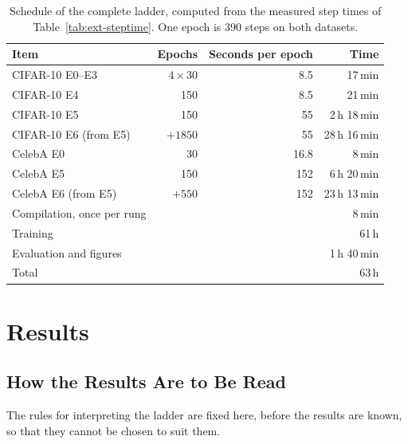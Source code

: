 \begin{table}[htbp]
    \centering
    \caption{Schedule of the complete ladder, computed from the measured step times of
    Table~\ref{tab:ext-steptime}. One epoch is 390 steps on both datasets.}
    \label{tab:ext-schedule}
    \begin{tabular}{lrrr}
        \toprule
        Item & Epochs & Seconds per epoch & Time \\
        \midrule
        CIFAR-10 E0--E3              & $4 \times 30$ & 8.5  & 17\,min \\
        CIFAR-10 E4                  & 150           & 8.5  & 21\,min \\
        CIFAR-10 E5                  & 150           & 55   & 2\,h 18\,min \\
        CIFAR-10 E6 (from E5)        & $+1850$       & 55   & 28\,h 16\,min \\
        CelebA E0                    & 30            & 16.8 & 8\,min \\
        CelebA E5                    & 150           & 152  & 6\,h 20\,min \\
        CelebA E6 (from E5)          & $+550$        & 152  & 23\,h 13\,min \\
        Compilation, once per rung   &               &      & 8\,min \\
        \midrule
        Training                     &               &      & 61\,h \\
        Evaluation and figures       &               &      & 1\,h 40\,min \\
        \midrule
        Total                        &               &      & 63\,h \\
        \bottomrule
    \end{tabular}
\end{table}

\section{Results}
\label{sec:ext-results}

\subsection{How the Results Are to Be Read}

The rules for interpreting the ladder are fixed here, before the results are known, so that they
cannot be chosen to suit them.


